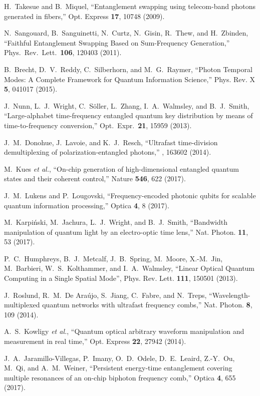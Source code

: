 \documentclass[twocolumn,amssymb, nobibnotes, showpacs, aps, pra,10pt]{revtex4-1}
\begin{document}
\begin{thebibliography}{99}
 H.~Takesue and B.~Miquel, ``Entanglement swapping using telecom-band photons generated in fibers,'' Opt. Express {\bf 17}, 10748 (2009).

N.~Sangouard, B.~Sanguinetti, N.~Curtz, N.~Gisin, R.~Thew, and H.~Zbinden, ``Faithful Entanglement Swapping Based on Sum-Frequency Generation,'' Phys.~Rev.~Lett.~{\bf106}, 120403 (2011).

 B.~Brecht, D.~V.~Reddy, C.~Silberhorn, and M.~G.~Raymer, ``Photon Temporal Modes: A Complete Framework for Quantum Information Science,'' Phys. Rev. X {\bf 5}, 041017 (2015).

J.~Nunn, L.~J.~Wright, C.~S\"oller, L.~Zhang, I.~A.~Walmsley, and B.~J.~Smith, ``Large-alphabet time-frequency entangled quantum key distribution by means of time-to-frequency conversion,'' Opt.~Expr.~{\bf21}, 15959 (2013).

 J.~M.~Donohue, J.~Lavoie, and K.~J.~Resch, ``Ultrafast time-division demultiplexing of polarization-entangled photons,'' , 163602 (2014).

M.~Kues {\em et al.}, ``On-chip generation of high-dimensional entangled quantum states and their coherent control,'' Nature {\bf 546}, 622 (2017).

 J.~M.~Lukens and P.~Lougovski, ``Frequency-encoded photonic qubits for scalable quantum information processing,'' Optica {\bf 4}, 8 (2017).

 M.~Karpi\'nski, M.~Jachura, L.~J.~Wright, and B.~J.~Smith, ``Bandwidth manipulation of quantum light by an electro-optic time lens,'' Nat. Photon. {\bf 11}, 53 (2017).

 P.~C.~Humphreys, B.~J.~Metcalf, J.~B.~Spring, M.~Moore, X.-M.~Jin, M.~Barbieri, W.~S.~Kolthammer, and I.~A.~Walmsley, ``Linear Optical Quantum Computing in a Single Spatial Mode'', Phys. Rev. Lett. {\bf 111}, 150501 (2013).

 J.~Roslund, R.~M.~De Ara\'ujo, S.~Jiang, C.~Fabre, and N.~Treps, ``Wavelength-multiplexed quantum networks with ultrafast frequency combs,'' Nat. Photon. {\bf 8}, 109 (2014).

 A.~S.~Kowligy {\em et al.}, ``Quantum optical arbitrary waveform manipulation and measurement in real time,'' Opt. Express {\bf 22}, 27942 (2014).

 J.~A.~Jaramillo-Villegas, P.~Imany, O.~D.~Odele, D.~E.~Leaird, Z.-Y.~Ou, M.~Qi, and A.~M.~Weiner, ``Persistent energy-time entanglement covering multiple resonances of an on-chip biphoton frequency comb,'' Optica {\bf 4}, 655 (2017).


\end{thebibliography}
\end{document}
